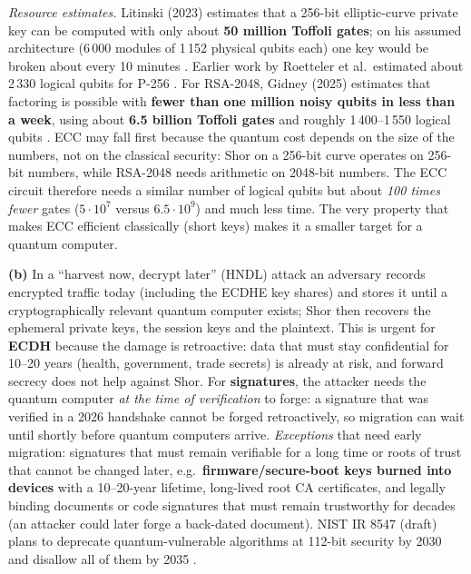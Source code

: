 \documentclass[11pt,a4paper]{article}
\begin{document}
\emph{Resource estimates.} Litinski (2023) estimates that a 256-bit elliptic-curve private key can be
computed with only about \textbf{50 million Toffoli gates}; on his assumed architecture (6\,000 modules of
1\,152 physical qubits each) one key would be broken about every 10 minutes \cite{litinski}. Earlier work by
Roetteler et al.\ estimated about 2\,330 logical qubits for P-256 \cite{roetteler}. For RSA-2048, Gidney (2025)
estimates that factoring is possible with \textbf{fewer than one million noisy qubits in less than a week},
using about \textbf{6.5 billion Toffoli gates} and roughly 1\,400--1\,550 logical qubits \cite{gidney2025}.
ECC may fall first because the quantum cost depends on the size of the numbers, not on the classical security:
Shor on a 256-bit curve operates on 256-bit numbers, while RSA-2048 needs arithmetic on 2048-bit numbers. The ECC
circuit therefore needs a similar number of logical qubits but about \emph{100 times fewer} gates
($5\cdot 10^{7}$ versus $6.5\cdot 10^{9}$) and much less time. The very property that
makes ECC efficient classically (short keys) makes it a smaller target for a quantum computer.

\textbf{(b)} In a ``harvest now, decrypt later'' (HNDL) attack an adversary records encrypted traffic today
(including the ECDHE key shares) and stores it until a cryptographically relevant quantum computer exists; Shor then
recovers the ephemeral private keys, the session keys and the plaintext. This is urgent for \textbf{ECDH} because
the damage is retroactive: data that must stay confidential for 10--20 years (health, government, trade secrets) is
already at risk, and forward secrecy does not help against Shor. For \textbf{signatures}, the attacker needs the
quantum computer \emph{at the time of verification} to forge: a signature that was verified in a 2026 handshake
cannot be forged retroactively, so migration can wait until shortly before quantum computers arrive.
\emph{Exceptions} that need early migration: signatures that must remain verifiable for a long time or roots of
trust that cannot be changed later, e.g.\ \textbf{firmware/secure-boot keys burned into devices} with a 10--20-year
lifetime, long-lived root CA certificates, and legally binding documents or code signatures that must remain
trustworthy for decades (an attacker could later forge a back-dated document). NIST IR 8547 (draft) plans to deprecate
quantum-vulnerable algorithms at 112-bit security by 2030 and disallow all of them by 2035 \cite{ir8547}.
\end{document}
